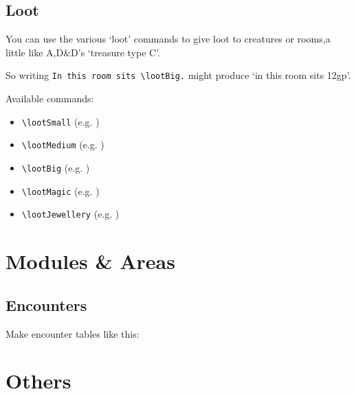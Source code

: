 \documentclass[a4paper,openany]{book}
\begin{document}
\begin{multicols}{2}
\subsection{Loot}

You can use the various `loot' commands to give loot to creatures or rooms,a little like A,D\&D's `treasure type C'.

So writing \verb"In this room sits \lootBig." might produce `in this room sits 12gp'.

Available commands:

\begin{itemize}

  \item
  \verb"\lootSmall" (e.g. \lootSmall)
  \item
  \verb"\lootMedium" (e.g. \lootMedium)
  \item
  \verb"\lootBig" (e.g. \lootBig)
  \item
  \verb"\lootMagic" (e.g. \lootMagic)
  \item
  \verb"\lootJewellery" (e.g. \lootJewellery)

\end{itemize}

\end{multicols}

\section{Modules \& Areas}

\subsection{Encounters}

Make encounter tables like this:

\section{Others}
\end{document}
